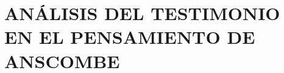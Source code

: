 \documentclass[./main.tex]{subfiles}
\begin{document}
\setcounter{chapter}{2}

\chapter{ANÁLISIS DEL TESTIMONIO EN EL PENSAMIENTO DE ANSCOMBE}




\end{document}

